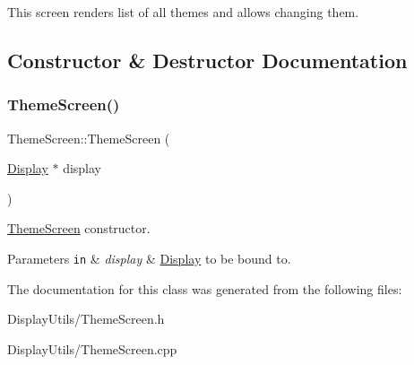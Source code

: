 This screen renders list of all themes and allows changing them. 

\subsection{Constructor \& Destructor Documentation}
\mbox{\label{classThemeScreen_af62f34712361648223d8355ac9cbeb1a}} 
\subsubsection{\texorpdfstring{Theme\+Screen()}{ThemeScreen()}}
{\footnotesize\ttfamily Theme\+Screen\+::\+Theme\+Screen (\begin{DoxyParamCaption}\item[{\mbox{\hyperlink{classDisplay}{Display}} $\ast$}]{display }\end{DoxyParamCaption})}



\mbox{\hyperlink{classThemeScreen}{Theme\+Screen}} constructor. 


\begin{DoxyParams}[1]{Parameters}
\mbox{\tt in}  & {\em display} & \mbox{\hyperlink{classDisplay}{Display}} to be bound to. \\
\hline
\end{DoxyParams}


The documentation for this class was generated from the following files\+:\begin{DoxyCompactItemize}
\item 
Display\+Utils/Theme\+Screen.\+h\item 
Display\+Utils/Theme\+Screen.\+cpp\end{DoxyCompactItemize}
